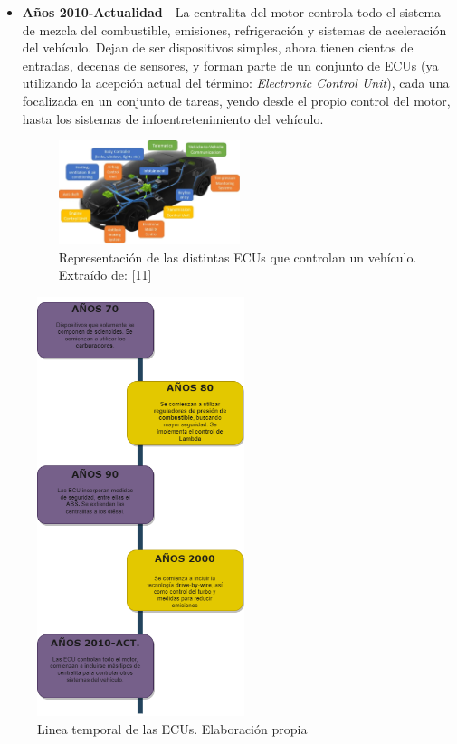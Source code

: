 \begin{itemize}
    \item \textbf{Años 2010-Actualidad} - La centralita del motor controla todo el sistema de mezcla del combustible, emisiones, refrigeración y sistemas de aceleración del vehículo. Dejan de ser dispositivos simples, ahora tienen cientos de entradas, decenas de sensores, y forman parte de un conjunto de ECUs (ya utilizando la acepción actual del término: \textit{Electronic Control Unit}), cada una focalizada en un conjunto de tareas, yendo desde el propio control del motor, hasta los sistemas de infoentretenimiento del vehículo. 
       

    \begin{figure}[h]
        \centering
        \includegraphics[width=0.5\textwidth]{imagenes/ECU_autotechdrive_completa.png}
        \caption{Representación de las distintas ECUs que controlan un vehículo. Extraído de: [11]}
    \end{figure}
\end{itemize}

\newpage
       
\begin{figure}[h]
    \centering
    \includegraphics[width=0.54\textwidth]{imagenes/timeline_ECU.png}
    \caption{Linea temporal de las ECUs. Elaboración propia}
\end{figure}


